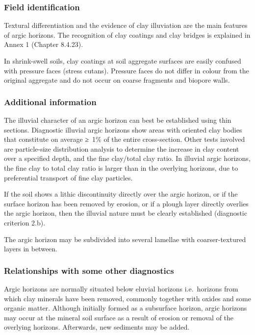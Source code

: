 \documentclass[
  letterpaper,
  DIV=11,
  numbers=noendperiod]{scrreprt}
\begin{document}
\hypertarget{field-identification-1}{%
\subsubsection{Field identification}\label{field-identification-1}}

Textural differentiation and the evidence of clay illuviation are the
main features of argic horizons. The recognition of clay coatings and
clay bridges is explained in Annex 1 (Chapter 8.4.23).

In shrink-swell soils, clay coatings at soil aggregate surfaces are
easily confused with pressure faces (stress cutans). Pressure faces do
not differ in colour from the original aggregate and do not occur on
coarse fragments and biopore walls.

\hypertarget{additional-information-1}{%
\subsubsection{Additional information}\label{additional-information-1}}

The illuvial character of an argic horizon can best be established using
thin sections. Diagnostic illuvial argic horizons show areas with
oriented clay bodies that constitute on average ≥~1\% of the entire
cross-section. Other tests involved are particle-size distribution
analysis to determine the increase in clay content over a specified
depth, and the fine clay/total clay ratio. In illuvial argic horizons,
the fine clay to total clay ratio is larger than in the overlying
horizons, due to preferential transport of fine clay particles.

If the soil shows a lithic discontinuity directly over the argic
horizon, or if the surface horizon has been removed by erosion, or if a
plough layer directly overlies the argic horizon, then the illuvial
nature must be clearly established (diagnostic criterion 2.b).

The argic horizon may be subdivided into several lamellae with
coarser-textured layers in between.

\hypertarget{relationships-with-some-other-diagnostics-2}{%
\subsubsection{Relationships with some other
diagnostics}\label{relationships-with-some-other-diagnostics-2}}

Argic horizons are normally situated below eluvial horizons
i.e.~horizons from which clay minerals have been removed, commonly
together with oxides and some organic matter. Although initially formed
as a subsurface horizon, argic horizons may occur at the mineral soil
surface as a result of erosion or removal of the overlying horizons.
Afterwards, new sediments may be added.
\end{document}
